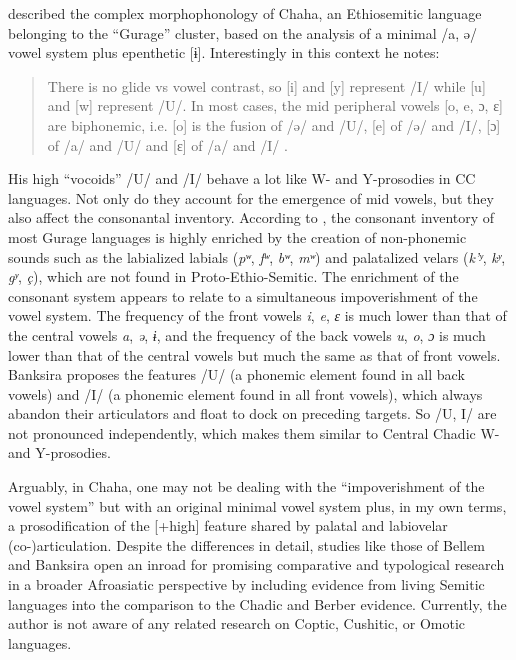 \documentclass[output=paper]{langscibook}
\begin{document}
\citet{Banksira2000} described the complex morphophonology of Chaha, an Ethio\-sem\-itic language belonging to the ``Gurage'' cluster, based on the analysis of a minimal /a, ə/ vowel system plus epenthetic [ɨ]. Interestingly in this context he notes:

\begin{quote}
There is no glide vs vowel contrast, so [i] and [y] represent /I/ while [u] and [w] represent /U/. In most cases, the mid peripheral vowels [o, e, ɔ, ɛ] are biphonemic, i.e. [o] is the fusion of /ə/ and /U/, [e] of /ə/ and /I/, [ɔ] of /a/ and /U/ and [ɛ] of /a/ and /I/ \citep[3]{Banksira2000}.
\end{quote}

His high ``vocoids'' /U/ and /I/ behave a lot like W- and Y-prosodies in CC languages. Not only do they account for the emergence of mid vowels, but they also affect the consonantal inventory. According to \citet[xxix\,ff.]{Banksira2000}, the consonant inventory of most Gurage languages is highly enriched by the creation of non-phonemic sounds such as the labialized labials (\textit{pʷ}, \textit{fʷ}, \textit{bʷ}, \textit{mʷ}) and palatalized velars (\textit{k’ʸ}, \textit{kʸ}, \textit{gʸ}, \textit{ç}), which are not found in Proto-Ethio-Semitic. The enrichment of the consonant system appears to relate to a simultaneous impoverishment of the vowel system. The frequency of the front vowels \textit{i}, \textit{e}, \textit{ɛ} is much lower than that of the central vowels \textit{a}, \textit{ə}, \textit{ɨ}, and the frequency of the back vowels \textit{u}, \textit{o}, \textit{ɔ} is much lower than that of the central vowels but much the same as that of front vowels. Banksira proposes the features /U/ (a phonemic element found in all back vowels) and /I/ (a phonemic element found in all front vowels), which always abandon their articulators and float to dock on preceding targets. So /U, I/ are not pronounced independently, which makes them similar to Central Chadic W- and Y-prosodies.

Arguably, in Chaha, one may not be dealing with the “impoverishment of the vowel system” \citep{Banksira2000} but with an original minimal vowel system plus, in my own terms, a prosodification of the [+high] feature shared by palatal and labiovelar (co-)articulation. Despite the differences in detail, studies like those of Bellem and Banksira open an inroad for promising comparative and typological research in a broader Afroasiatic perspective by including evidence from living Semitic languages into the comparison to the Chadic and Berber evidence. Currently, the author is not aware of any related research on Coptic, Cushitic, or Omotic languages. 
\end{document}
